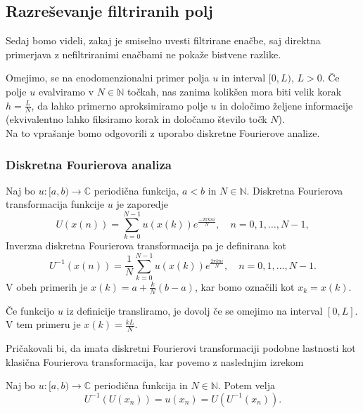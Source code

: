 \documentclass[mat2, tisk]{fmfdelo}
\newcommand{\N}{\mathbb N}
\newcommand{\C}{\mathbb C}
\begin{document}
\subsection{Razreševanje filtriranih polj}

Sedaj bomo videli, zakaj je smiselno uvesti filtrirane enačbe, saj 
direktna primerjava z nefiltriranimi enačbami ne pokaže bistvene razlike.

Omejimo, se na enodomenzionalni primer polja $u$ in interval $[0, L)$, 
$L > 0$. Če polje $u$ evalviramo v $N \in \N$ točkah, nas zanima 
kolikšen mora biti velik korak $h = \frac{L}{N}$, da lahko primerno aproksimiramo 
polje $u$ in določimo željene informacije (ekvivalentno lahko fiksiramo 
korak in določamo število točk $N$). \\
Na to vprašanje bomo odgovorili z uporabo diskretne Fourierove analize. 

\subsubsection{Diskretna Fourierova analiza}

\begin{definicija}
Naj bo $u: [a, b) \rightarrow \C$ periodična funkcija, $a < b$ in $N\in \N$. 
Diskretna Fourierova transformacija funkcije $u$ je zaporedje 
\begin{equation}
U(x(n)) = \sum_{k=0}^{N-1} u(x(k)) e^{\frac{-2\pi k n i}{N}}, \quad n = 0, 1, \dots, N-1,
\end{equation}
Inverzna diskretna Fourierova transformacija pa je definirana kot 
\begin{equation}
  U^{-1}(x(n)) = \frac{1}{N}\sum_{k=0}^{N-1} u(x(k)) e^{\frac{2\pi k n i}{N}}, \quad n = 0, 1, \dots, N-1.
\end{equation}
V obeh primerih je $x(k) = a + \frac{k}{N}(b-a)$, kar bomo označili kot
$x_k = x(k)$.
\end{definicija}

\begin{opomba}
Če funkcijo $u$ iz definicije transliramo, je dovolj če se 
omejimo na interval $[0, L]$. V tem primeru je $x(k) = \frac{kL}{N}$.
\end{opomba}

Pričakovali bi, da imata diskretni Fourierovi transformaciji podobne 
lastnosti kot klasična Fourierova transformacija, kar povemo z 
naslednjim izrekom 

\begin{izrek}
\label{izrek:iDFT}
Naj bo $u: [a, b) \rightarrow \C$ periodična funkcija in $N\in \N$. Potem velja
\begin{equation}
U^{-1}(U(x_n)) = u(x_n) = U(U^{-1}(x_n)).
\end{equation}
\end{izrek}
\end{document}
